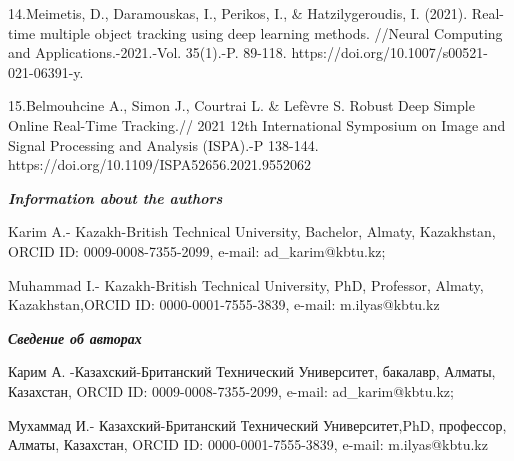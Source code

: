 14.Meimetis, D., Daramouskas, I., Perikos, I., \& Hatzilygeroudis, I.
(2021). Real-time multiple object tracking using deep learning methods.
//Neural Computing and Applications.-2021.-Vol. 35(1).-P. 89-118.
https://doi.org/10.1007/s00521-021-06391-y.

15.Belmouhcine A., Simon J., Courtrai L. \& Lefèvre S. Robust Deep
Simple Online Real-Time Tracking.// 2021 12th International Symposium on
Image and Signal Processing and Analysis (ISPA).-P 138-144.
https://doi.org/10.1109/ISPA52656.2021.9552062

\emph{{\bfseries Information about the authors}}

Karim A.- Kazakh-British Technical University, Bachelor, Almaty,
Kazakhstan, ORCID ID: 0009-0008-7355-2099, e-mail: ad\_karim@kbtu.kz;

Muhammad I.- Kazakh-British Technical University, PhD, Professor,
Almaty, Kazakhstan,ORCID ID: 0000-0001-7555-3839, e-mail:
m.ilyas@kbtu.kz

\emph{{\bfseries Сведение об авторах}}

Карим А. -Казахский-Британский Технический Университет, бакалавр,
Алматы, Казахстан, ORCID ID: 0009-0008-7355-2099, e-mail:
ad\_karim@kbtu.kz;

Мухаммад И.- Казахский-Британский Технический Университет,PhD,
профессор, Алматы, Казахстан, ORCID ID: 0000-0001-7555-3839, e-mail:
m.ilyas@kbtu.kz
